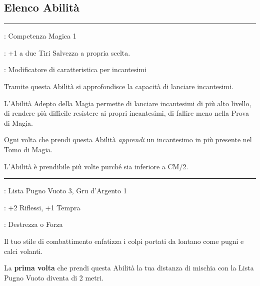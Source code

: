 \begin{multicols}{2}
\subsection{Elenco Abilità}

\smallskip\noindent\rule{\linewidth}{2pt} \hypertarget{Adepto della Magia}{}\medskip{}
\noindent
\begin{description}[noitemsep, topsep=0pt, parsep=0pt, partopsep=0pt, leftmargin=0cm, labelwidth=2.5cm]
    \item[\textbf{Requisito}]: Competenza Magica 1
    \item[\textbf{Tiri Salvezza}]: +1 a due Tiri Salvezza a propria scelta.
    \item[\textbf{Caratteristica}]: Modificatore di caratteristica per incantesimi
\end{description}

Tramite questa Abilità si approfondisce la capacità di lanciare incantesimi.

L'Abilità Adepto della Magia permette di lanciare incantesimi di più alto livello, di rendere più difficile resistere ai propri incantesimi, di fallire meno nella Prova di Magia.

Ogni volta che prendi questa Abilità \emph{apprendi} un incantesimo in più presente nel Tomo di Magia.

L'Abilità è prendibile più volte purché sia inferiore a CM/2.

\smallskip\noindent\rule{\linewidth}{2pt} \hypertarget{Ali della Fenice}{}\medskip{}
\noindent
\begin{description}[noitemsep, topsep=0pt, parsep=0pt, partopsep=0pt, leftmargin=0cm, labelwidth=2.5cm]
    \item[\textbf{Requisito}]: Lista Pugno Vuoto 3, Gru d'Argento 1
    \item[\textbf{Tiri Salvezza}]: +2 Riflessi, +1 Tempra
    \item[\textbf{Caratteristica}]: Destrezza o Forza
\end{description}

Il tuo stile di combattimento enfatizza i colpi portati da lontano come pugni e calci volanti.

La \textbf{prima volta} che prendi questa Abilità la tua distanza di mischia con la Lista Pugno Vuoto diventa di 2 metri.


\end{multicols}
